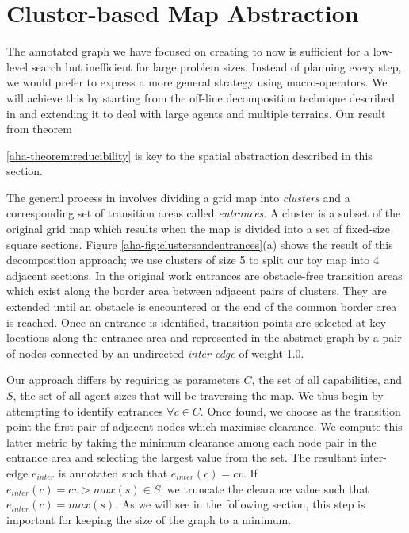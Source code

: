 \section{Cluster-based Map Abstraction}
\label{aha:mapabstraction}
The annotated graph we have focused on creating to now is sufficient for a low-level search but inefficient for large problem sizes. 
Instead of planning every step, we would prefer to express a more general strategy using macro-operators.
We will achieve this by starting from the off-line decomposition technique described in \cite{botea04} and extending it to deal with large agents and multiple terrains. 
Our result from theorem {\ref{aha-theorem:reducibility} is key to the spatial abstraction described in this section. 
\par \indent
The general process in \cite{botea04} involves dividing a grid map into \emph{clusters} and a corresponding set of transition areas called \emph{entrances}. 
A  cluster is a subset of the original grid map which results when the map is divided into a set of fixed-size square sections. 
Figure \ref{aha-fig:clustersandentrances}(a) shows the result of this decomposition approach; we use clusters of size 5 to split our toy map into 4 adjacent sections.
In the original work entrances are obstacle-free transition areas which exist along the border area between adjacent pairs of clusters. They are extended until an obstacle is encountered or the end of the common border area is reached. 
Once an entrance is identified, transition points are selected at key locations along the entrance area and represented in the abstract graph by a pair of nodes connected by an undirected \emph{inter-edge} of weight 1.0. 
\par \indent
Our approach differs by requiring as parameters $C$, the set of all capabilities, and $S$, the set of all agent sizes that will be traversing the map. We thus begin by attempting to identify entrances $\forall c \in C$. Once found, we choose as the transition point the first pair of adjacent nodes which maximise clearance. We compute this latter metric by taking the minimum clearance among each node pair in the entrance area and selecting the largest value from the set. The resultant inter-edge $e_{inter}$ is annotated such that $e_{inter}(c) = cv$. If $e_{inter}(c) = cv > max(s) \in S$, we truncate the clearance value such that $e_{inter}(c) = max(s)$. As we will see in the following section, this step is important for keeping the size of the graph to a minimum.
\par \indent
}
